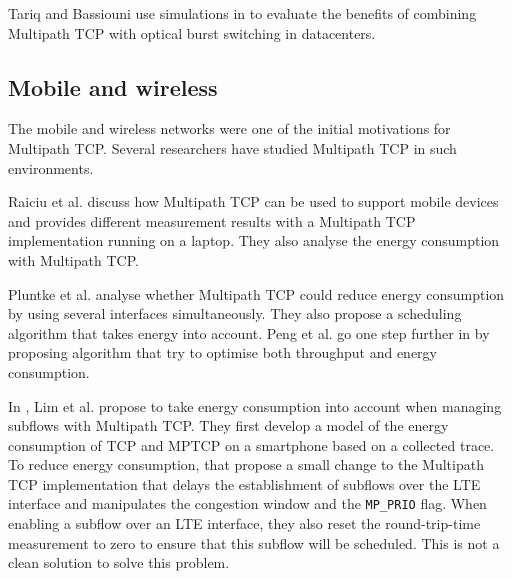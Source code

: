 Tariq and Bassiouni use simulations in \cite{Tariz_OBS:2014} to evaluate the benefits of combining Multipath TCP with optical burst switching in datacenters.

\subsection{Mobile and wireless}

The mobile and wireless networks were one of the initial motivations for Multipath TCP. Several researchers have studied Multipath TCP in such environments.

Raiciu et al. \cite{Raiciu_Opportunistic:2011} discuss how Multipath TCP can be used to support mobile devices and provides different measurement results with a Multipath TCP implementation running on a laptop. They also analyse the energy consumption with Multipath TCP.%

Pluntke et al. \cite{Pluntke_Saving:2011} analyse whether Multipath TCP could reduce energy consumption by using several interfaces simultaneously. They also propose a scheduling algorithm that takes energy into account. Peng et al. go one step further in  %
\cite{Peng_Energy:2014} by proposing algorithm that try to optimise both throughput and energy consumption. %


In \cite{Lim_Green:2014}, Lim et al. propose to take energy consumption into account when managing subflows with Multipath TCP. They first develop a model of the energy consumption of TCP and MPTCP on a smartphone based on a collected trace. To reduce energy consumption, that propose a small change to the Multipath TCP implementation that delays the establishment of subflows over the LTE interface and manipulates the congestion window and the \texttt{MP\_PRIO} flag. When enabling a subflow over an LTE interface, they also reset the round-trip-time measurement to zero to ensure that this subflow will be scheduled. This is not a clean solution to solve this problem.


